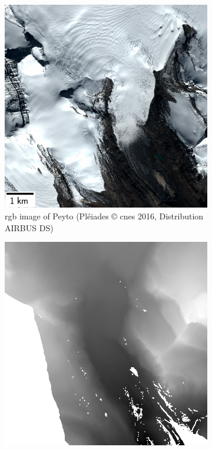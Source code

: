 \begin{figure}
    \centering
    \begin{subfigure}[t]{0.48\linewidth}
        \flushleft
        \includegraphics[width=\linewidth]{Images/Chap_6/miniature_Peyto.png}
        \caption{\acrshort{rgb} image of Peyto (Pléiades © \acrshort{cnes} 2016, Distribution AIRBUS DS)}
        \label{fig:miniature_Peyto_rgb}
    \end{subfigure}\hfill
    \begin{subfigure}[t]{0.48\linewidth}
        \flushright
        \includegraphics[width=\linewidth]{Images/Chap_6/miniature_Peyto_gt.png}

\end{subfigure}
\end{figure}

